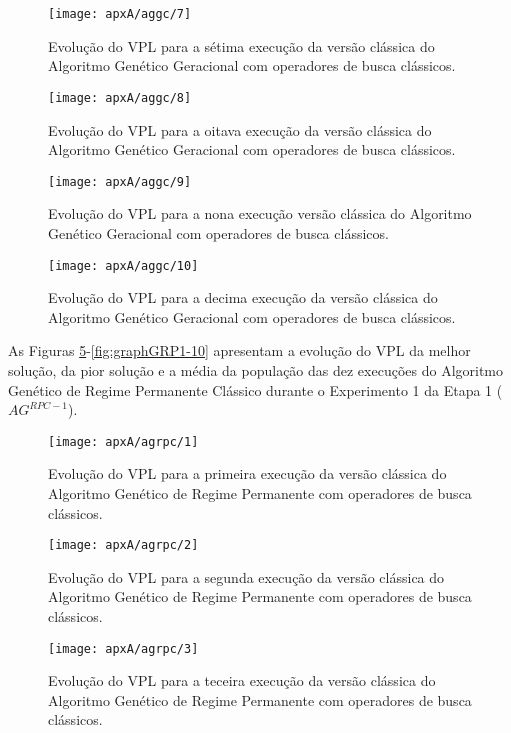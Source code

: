 \begin{figure}[H]
\centering
\texttt{[image: apxA/aggc/7]}
\caption{Evolução do VPL para a sétima execução da versão clássica do Algoritmo Genético Geracional com operadores de busca clássicos.}
\label{fig:graphGC1-07}
\end{figure}

\begin{figure}[H]
\centering
\texttt{[image: apxA/aggc/8]}
\caption{Evolução do VPL para a oitava execução da versão clássica do Algoritmo Genético Geracional com operadores de busca clássicos.}
\label{fig:graphGC1-08}
\end{figure}

\begin{figure}[H]
\centering
\texttt{[image: apxA/aggc/9]}
\caption{Evolução do VPL para a nona execução versão clássica do Algoritmo Genético Geracional com operadores de busca clássicos.}
\label{fig:graphGC1-09}
\end{figure}

\begin{figure}[H]
\centering
\texttt{[image: apxA/aggc/10]}
\caption{Evolução do VPL para a decima execução da versão clássica do Algoritmo Genético Geracional com operadores de busca clássicos.}
\label{fig:graphGC1-10}
\end{figure}

As Figuras \ref{fig:graphGRP1-01}-\ref{fig:graphGRP1-10} apresentam a evolução do VPL da melhor solução, da pior solução e a média da população das dez execuções do Algoritmo Genético de Regime Permanente Clássico durante o Experimento 1 da Etapa 1 ($AG^{RPC-1}$).

\begin{figure}[H]
\centering
\texttt{[image: apxA/agrpc/1]}
\caption{Evolução do VPL para a primeira execução da versão clássica do Algoritmo Genético de Regime Permanente com operadores de busca clássicos.}
\label{fig:graphGRP1-01}
\end{figure}

\begin{figure}[H]
\centering
\texttt{[image: apxA/agrpc/2]}
\caption{Evolução do VPL para a segunda execução da versão clássica do Algoritmo Genético de Regime Permanente com operadores de busca clássicos.}
\label{fig:graphGRP1-02}
\end{figure}

\begin{figure}[H]
\centering
\texttt{[image: apxA/agrpc/3]}
\caption{Evolução do VPL para a teceira execução da versão clássica do Algoritmo Genético de Regime Permanente com operadores de busca clássicos.}
\label{fig:graphGRP1-03}
\end{figure}

